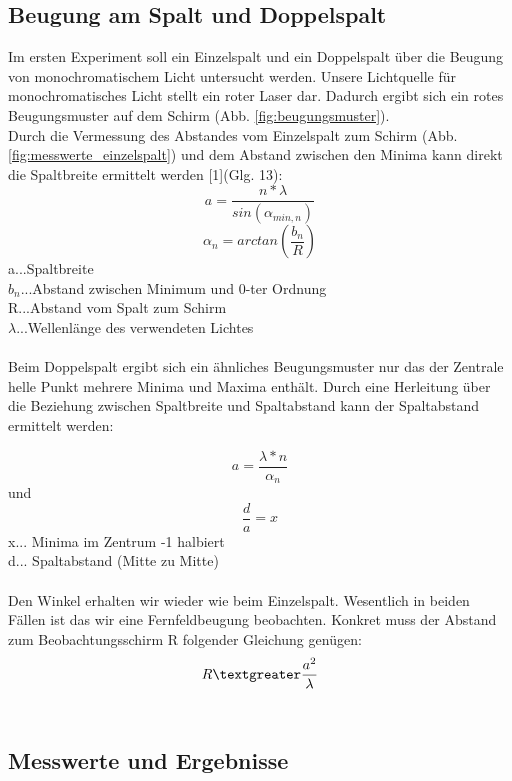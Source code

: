 \documentclass[12pt,a4paper]{article}
\begin{document}
\begin{multicols}{2}

\section{Beugung am Spalt und Doppelspalt}
Im ersten Experiment soll ein Einzelspalt und ein Doppelspalt über die Beugung von monochromatischem Licht untersucht werden. Unsere Lichtquelle für monochromatisches Licht stellt ein roter Laser dar. Dadurch ergibt sich ein rotes Beugungsmuster auf dem Schirm (Abb. \ref{fig:beugungsmuster}). 
\\
Durch die Vermessung des Abstandes vom Einzelspalt zum Schirm (Abb. \ref{fig:messwerte_einzelspalt}) und dem Abstand zwischen den Minima kann direkt die Spaltbreite ermittelt werden [1](Glg. 13):
$$a = \frac{n*\lambda}{sin(\alpha_{min,n})} $$
$$\alpha_n = arctan(\frac{b_n}{R})$$
a...Spaltbreite\\
$b_n$...Abstand zwischen Minimum und 0-ter Ordnung\\
R...Abstand vom Spalt zum Schirm\\
$\lambda$...Wellenlänge des verwendeten Lichtes\\
\\
Beim Doppelspalt ergibt sich ein ähnliches Beugungsmuster nur das der Zentrale helle Punkt mehrere Minima und Maxima enthält. Durch eine Herleitung über die Beziehung zwischen Spaltbreite und Spaltabstand kann der Spaltabstand ermittelt werden:

$$ a = \frac{\lambda * n}{\alpha_n} $$
und
$$\frac{d}{a} = x$$
\noindent
x... Minima im Zentrum -1 halbiert\\
d... Spaltabstand (Mitte zu Mitte)\\
\\
Den Winkel erhalten wir wieder wie beim Einzelspalt.
Wesentlich in beiden Fällen ist das wir eine Fernfeldbeugung beobachten. Konkret muss der Abstand zum Beobachtungsschirm R folgender Gleichung genügen:
$$R \textgreater \frac{a^2}{\lambda}$$
\\
%

\subsection{Messwerte und Ergebnisse}



\end{multicols}
\end{document}
